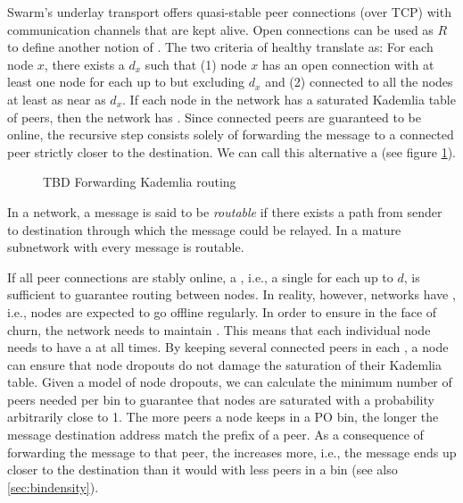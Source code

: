 Swarm's underlay transport offers quasi-stable peer connections (over TCP) with communication channels that are kept alive. Open connections can be used as $R$ to define another notion of . The two criteria of healthy  translate as: For each node $x$, there exists a  $d_x$ such that (1) node $x$ has an open connection with at least one node for each  up to but excluding $d_x$ and (2) connected to all the nodes at least as near as $d_x$. If each node in the network has a saturated Kademlia table of peers, then the network has . Since connected peers are guaranteed to be online, the recursive step consists solely of forwarding the message to a connected peer strictly closer to the destination. We can call this alternative a  (see figure \ref{fig:forwarding-kademlia}). 


\begin{figure}[htbp]
   \centering
   \caption[Forwarding Kademlia routing]{TBD Forwarding Kademlia routing}
   \label{fig:forwarding-kademlia}
\end{figure}


In a  network, a message is said to be \emph{routable} if there exists a path from sender to destination through which the message could be relayed. In a mature subnetwork with  every message is routable. 

If all peer connections are stably online, a , i.e., a single  for each  up to $d$, is sufficient to guarantee routing between nodes. In reality, however, networks have , i.e., nodes are expected to go offline regularly. In order to ensure  in the face of churn, the network needs to maintain . This means that each individual node needs to have a  at all times. By keeping several connected peers in each , a node can ensure that node dropouts do not damage the saturation of their Kademlia table. Given a model of node dropouts, we can calculate the minimum number of peers needed per bin to guarantee that nodes are saturated with a probability arbitrarily close to 1. The more peers a node keeps in a PO bin, the longer the message destination address match the prefix of a peer. As a consequence of forwarding the message to that peer, the  increases more, i.e., the message ends up closer to the destination than it would with less peers in a bin (see also \ref{sec:bindensity}).



